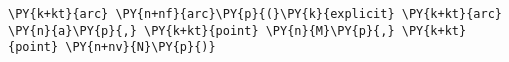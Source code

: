 \begin{Verbatim}[commandchars=\\\{\}]
    \PY{k+kt}{arc} \PY{n+nf}{arc}\PY{p}{(}\PY{k}{explicit} \PY{k+kt}{arc} \PY{n}{a}\PY{p}{,} \PY{k+kt}{point} \PY{n}{M}\PY{p}{,} \PY{k+kt}{point} \PY{n+nv}{N}\PY{p}{)}
\end{Verbatim}
